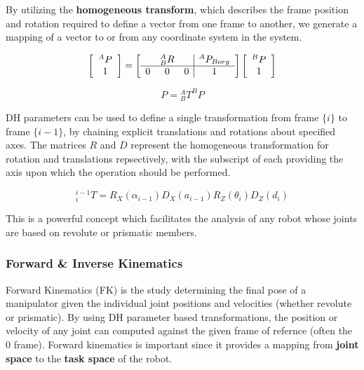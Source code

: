 \documentclass[journal]{IEEEtran}
\begin{document}
By utilizing the \textbf{homogeneous transform}, which describes the frame position and rotation required to define a vector from one frame to another, we generate a mapping of a vector to or from any coordinate system in the system.

\begin{equation}
    $$
    \left[\begin{array}{c}
    {}^{A}P \\
    1
    \end{array}\right]=\left[\begin{array}{ccc|c}
    {} & {}^{A}_{B}R & & {}^{A}P_{B org} \\
    \hline 0 & 0 & 0 & 1
    \end{array}\right]\left[\begin{array}{c}
    {}^{B}P \\
    1
    \end{array}\right]
    $$
\end{equation}


\begin{equation}
        P = { }_{B}^{A} T^{B} P
\end{equation}

DH parameters can be used to define a single transformation from frame $\{ i\}$ to frame $\{ i-1 \}$, by chaining explicit translations and rotations about specified axes. The matrices $R$ and $D$ represent the homogeneous transformation for rotation and translations repsectively, with the subscript of each providing the axis upon which the operation should be performed.

$$
{ }_{i}^{i-1} T=R_{X}\left(\alpha_{i-1}\right) D_{X}\left(a_{i-1}\right) R_{Z}\left(\theta_{i}\right) D_{Z}\left(d_{i}\right)
$$

This is a powerful concept which facilitates the analysis of any robot whose joints are based on revolute or prismatic members. \cite{craig_introduction_2005}
\\

\subsubsection{Forward \& Inverse Kinematics}

Forward Kinematics (FK) is the study determining the final pose of a manipulator given the individual joint positions and velocities (whether revolute or prismatic). By using DH parameter based transformations, the position or velocity of any joint can computed against the given frame of refernce (often the {0} frame). Forward kinematics is important since it provides a mapping from \textbf{joint space} to the \textbf{task space} of the robot. \\
\end{document}
